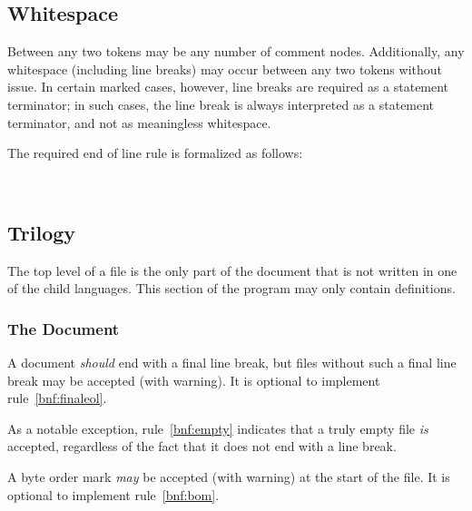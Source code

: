 \subsection{Whitespace}

Between any two tokens may be any number of comment nodes. Additionally,
any whitespace (including line breaks) may occur between any two tokens
without issue. In certain marked cases, however, line breaks are required
as a statement terminator; in such cases, the line break is always interpreted
as a statement terminator, and not as meaningless whitespace.

The required end of line rule is formalized as follows:

\begin{bnf*}
     \\
\end{bnf*}

\subsection{Trilogy}

The top level of a \Trilogy{} file is the only part of the document that
is not written in one of the child languages. This section of the program
may only contain definitions.

\subsubsection{The Document}

A \Trilogy{} document \emph{should} end with a final line break,
but files without such a final line break may be accepted (with warning).
It is optional to implement rule~\ref{bnf:finaleol}.

As a notable exception, rule~\ref{bnf:empty} indicates that a truly empty
file \emph{is} accepted, regardless of the fact that it does not end with
a line break.

A byte order mark \emph{may} be accepted (with warning) at the start of
the file. It is optional to implement rule~\ref{bnf:bom}.

